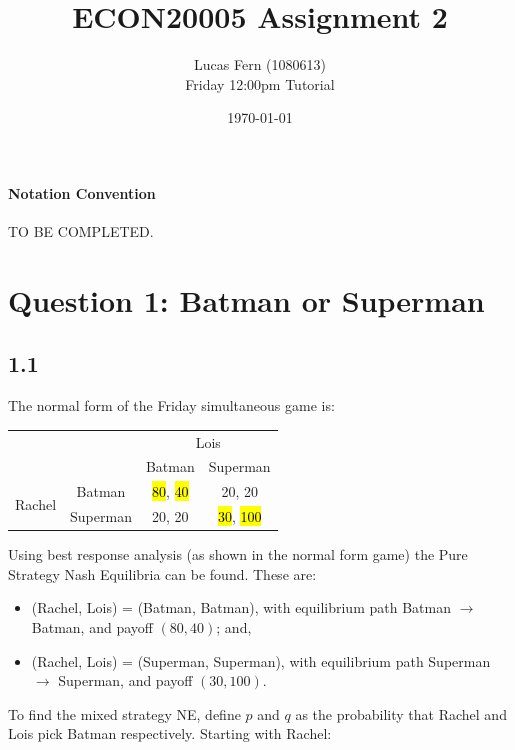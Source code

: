 \documentclass{article}
\title{\vspace{-2cm}ECON20005 Assignment 2}
\date{\today}
\author{Lucas Fern (1080613)\\Friday 12:00pm Tutorial}
\begin{document}
\maketitle
\paragraph{Notation Convention} {\color{magenta}TO BE COMPLETED}.
\section*{Question 1: Batman or Superman}
\subsection*{1.1}
The normal form of the Friday simultaneous game is:
\begin{table}[H]
    \centering
    \begin{tabular}{@{}cccc@{}}
                                                 &                               & \multicolumn{2}{c}{Lois}                                    \\ \cmidrule(l){3-4} 
                                                 & \multicolumn{1}{c|}{}         & \multicolumn{1}{c|}{Batman} & \multicolumn{1}{c|}{Superman} \\ \cmidrule(l){2-4} 
    \multicolumn{1}{c|}{\multirow{2}{*}{Rachel}} & \multicolumn{1}{c|}{Batman}   & \multicolumn{1}{c|}{\hl{80}, \hl{40}} & \multicolumn{1}{c|}{20, 20}   \\ \cmidrule(l){2-4} 
    \multicolumn{1}{c|}{}                        & \multicolumn{1}{c|}{Superman} & \multicolumn{1}{c|}{20, 20} & \multicolumn{1}{c|}{\hl{30}, \hl{100}}  \\ \cmidrule(l){2-4} 
    \end{tabular}
\end{table}
\noindent Using best response analysis (as shown in the normal form game) the Pure Strategy Nash Equilibria can be found. These are:
\begin{itemize}
    \item (Rachel, Lois) = (Batman, Batman), with equilibrium path Batman $\longrightarrow$ Batman, and payoff $(80, 40)$; and,
    \item (Rachel, Lois) = (Superman, Superman), with equilibrium path Superman $\longrightarrow$ Superman, and payoff $(30, 100)$.
\end{itemize}
To find the mixed strategy NE, define $p$ and $q$ as the probability that Rachel and Lois pick Batman respectively. Starting with Rachel:
\end{document}
